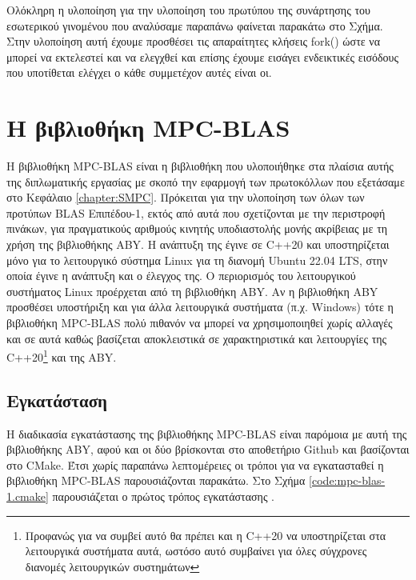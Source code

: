 Ολόκληρη η υλοποίηση για την υλοποίηση του πρωτύπου της συνάρτησης του εσωτερικού γινομένου που αναλύσαμε παραπάνω φαίνεται παρακάτω στο Σχήμα. Στην υλοποίηση αυτή έχουμε προσθέσει τις απαραίτητες κλήσεις fork() ώστε να μπορεί να εκτελεστεί και να ελεγχθεί και επίσης έχουμε εισάγει ενδεικτικές εισόδους που υποτίθεται ελέγχει ο κάθε συμμετέχον αυτές είναι οι.



\section{Η βιβλιοθήκη MPC-BLAS}

Η βιβλιοθήκη MPC-BLAS είναι η βιβλιοθήκη που υλοποιήθηκε στα πλαίσια αυτής της διπλωματικής εργασίας με σκοπό την εφαρμογή των πρωτοκόλλων που εξετάσαμε στο Κεφάλαιο \ref{chapter:SMPC}. Πρόκειται για την υλοποίηση των όλων των προτύπων BLAS Επιπέδου-1, εκτός από αυτά που σχετίζονται με την περιστροφή πινάκων, για πραγματικούς αριθμούς κινητής υποδιαστολής μονής ακρίβειας με τη χρήση της βιβλιοθήκης ABY. Η ανάπτυξη της έγινε σε C++20 και υποστηρίζεται μόνο για το λειτουργικό σύστημα Linux για τη διανομή Ubuntu 22.04 LTS, στην οποία έγινε η ανάπτυξη και ο έλεγχος της. Ο περιορισμός του λειτουργικού συστήματος Linux προέρχεται από τη βιβλιοθήκη ABY. Αν η βιβλιοθήκη ABY προσθέσει υποστήριξη και για άλλα λειτουργικά συστήματα (π.χ. Windows) τότε η βιβλιοθήκη MPC-BLAS πολύ πιθανόν να μπορεί να χρησιμοποιηθεί χωρίς αλλαγές και σε αυτά καθώς βασίζεται αποκλειστικά σε χαρακτηριστικά και λειτουργίες της C++20\footnote{Προφανώς για να συμβεί αυτό θα πρέπει και η C++20 να υποστηρίζεται στα λειτουργικά συστήματα αυτά, ωστόσο αυτό συμβαίνει για όλες σύγχρονες διανομές λειτουργικών συστημάτων} και της ABY.

\subsection{Εγκατάσταση}

Η διαδικασία εγκατάστασης της βιβλιοθήκης MPC-BLAS είναι παρόμοια με αυτή της βιβλιοθήκης ABY, αφού και οι δύο βρίσκονται στο αποθετήριο Github και βασίζονται στο CMake. Έτσι χωρίς παραπάνω λεπτομέρειες οι τρόποι για να εγκατασταθεί η βιβλιοθήκη MPC-BLAS παρουσιάζονται παρακάτω. Στο Σχήμα \ref{code:mpc-blas-1.cmake} παρουσιάζεται ο πρώτος τρόπος εγκατάστασης .

